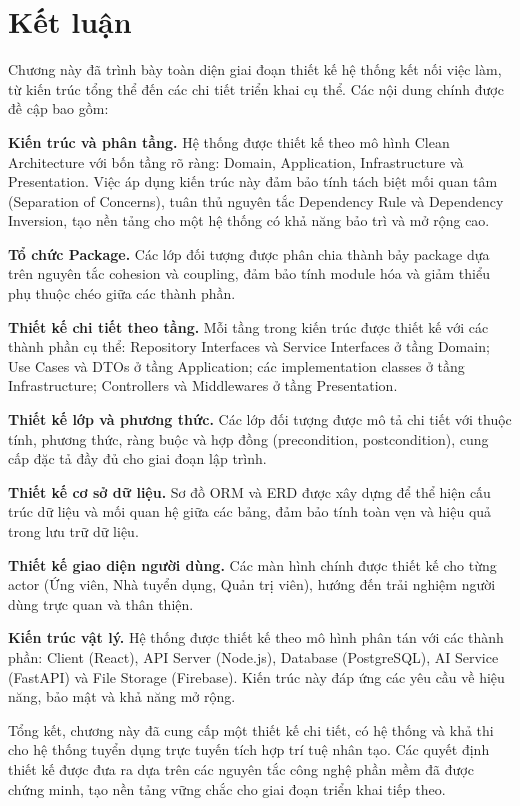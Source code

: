 \section{Kết luận}
\label{sec:design-conclusion}

Chương này đã trình bày toàn diện giai đoạn thiết kế hệ thống kết nối việc làm, từ kiến trúc tổng thể đến các chi tiết triển khai cụ thể. Các nội dung chính được đề cập bao gồm:

\textbf{Kiến trúc và phân tầng.} Hệ thống được thiết kế theo mô hình Clean Architecture với bốn tầng rõ ràng: Domain, Application, Infrastructure và Presentation. Việc áp dụng kiến trúc này đảm bảo tính tách biệt mối quan tâm (Separation of Concerns), tuân thủ nguyên tắc Dependency Rule và Dependency Inversion, tạo nền tảng cho một hệ thống có khả năng bảo trì và mở rộng cao.

\textbf{Tổ chức Package.} Các lớp đối tượng được phân chia thành bảy package dựa trên nguyên tắc cohesion và coupling, đảm bảo tính module hóa và giảm thiểu phụ thuộc chéo giữa các thành phần.

\textbf{Thiết kế chi tiết theo tầng.} Mỗi tầng trong kiến trúc được thiết kế với các thành phần cụ thể: Repository Interfaces và Service Interfaces ở tầng Domain; Use Cases và DTOs ở tầng Application; các implementation classes ở tầng Infrastructure; Controllers và Middlewares ở tầng Presentation.

\textbf{Thiết kế lớp và phương thức.} Các lớp đối tượng được mô tả chi tiết với thuộc tính, phương thức, ràng buộc và hợp đồng (precondition, postcondition), cung cấp đặc tả đầy đủ cho giai đoạn lập trình.

\textbf{Thiết kế cơ sở dữ liệu.} Sơ đồ ORM và ERD được xây dựng để thể hiện cấu trúc dữ liệu và mối quan hệ giữa các bảng, đảm bảo tính toàn vẹn và hiệu quả trong lưu trữ dữ liệu.

\textbf{Thiết kế giao diện người dùng.} Các màn hình chính được thiết kế cho từng actor (Ứng viên, Nhà tuyển dụng, Quản trị viên), hướng đến trải nghiệm người dùng trực quan và thân thiện.

\textbf{Kiến trúc vật lý.} Hệ thống được thiết kế theo mô hình phân tán với các thành phần: Client (React), API Server (Node.js), Database (PostgreSQL), AI Service (FastAPI) và File Storage (Firebase). Kiến trúc này đáp ứng các yêu cầu về hiệu năng, bảo mật và khả năng mở rộng.

Tổng kết, chương này đã cung cấp một thiết kế chi tiết, có hệ thống và khả thi cho hệ thống tuyển dụng trực tuyến tích hợp trí tuệ nhân tạo. Các quyết định thiết kế được đưa ra dựa trên các nguyên tắc công nghệ phần mềm đã được chứng minh, tạo nền tảng vững chắc cho giai đoạn triển khai tiếp theo.

